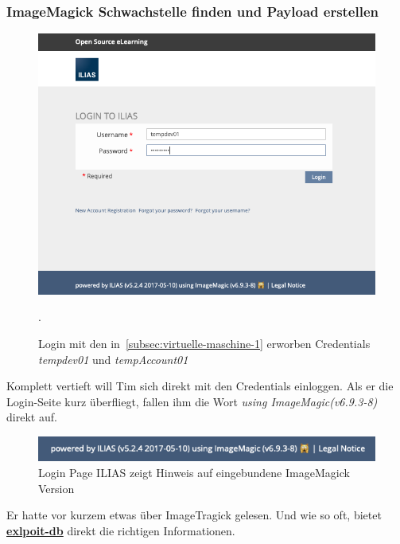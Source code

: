 \documentclass[10pt, a4paper,onecolumn ,titlepage]{article}
\begin{document}
    \subsubsection{ImageMagick Schwachstelle finden und Payload erstellen}
    \label{subsubsec:imageMagickFinden}

    \begin{figure}[H]
        \centering
        \includegraphics[width=1\textwidth]{storyline_bilder_vm2/loginAlsDev01}
        \caption{Login mit den in~\ref{subsec:virtuelle-maschine-1} erworben Credentials \textit{tempdev01}
        \break und \textit{tempAccount01}} .
        \label{fig:loginAlsDev}
    \end{figure}
    
    Komplett vertieft will Tim sich direkt mit den Credentials einloggen.
    Als er die Login-Seite kurz überfliegt, fallen ihm die Wort \textit{using ImageMagic(v6.9.3-8)} direkt auf.
    \begin{figure}[H]
        \centering
        \includegraphics[width=1\textwidth]{storyline_bilder_vm2/loginPageHinweisImageMagick}
        \caption{Login Page ILIAS zeigt Hinweis auf eingebundene ImageMagick Version}
        \label{fig:loginPageHinweis}
    \end{figure}

    \noindent
    Er hatte vor kurzem etwas über ImageTragick gelesen.
    Und wie so oft, bietet \href{https://www.exploit-db.com/exploits/39767}{\textbf{exlpoit-db}} direkt die richtigen Informationen.
\end{document}
